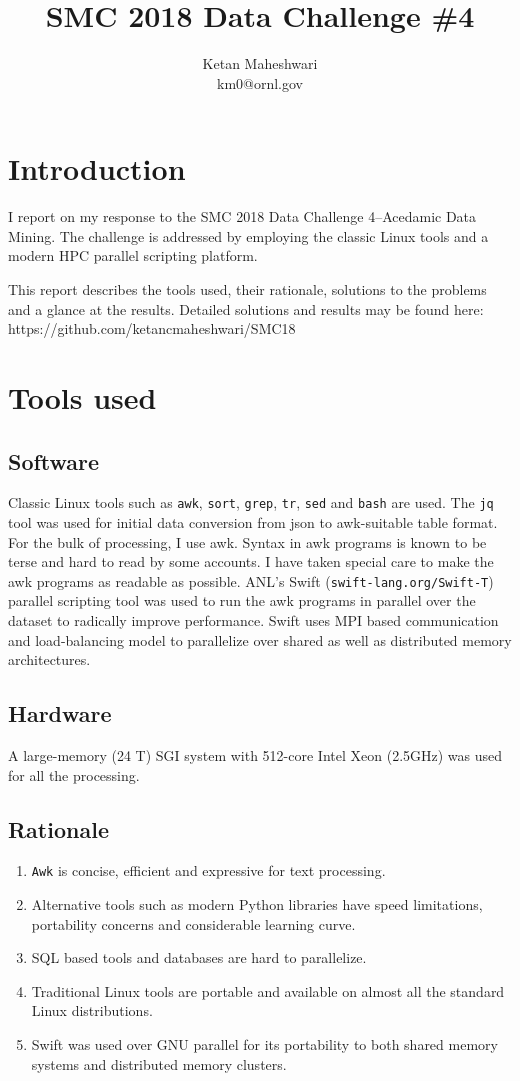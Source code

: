 \documentclass{report}
\title{SMC 2018 Data Challenge \#4}
\author{Ketan Maheshwari\\ km0@ornl.gov}
\begin{document}
\maketitle
\section*{Introduction}

I report on my response to the SMC 2018 Data Challenge 4--Acedamic Data Mining.
The challenge is addressed by employing the classic Linux tools and a modern HPC
parallel scripting platform.

This report describes the tools used, their rationale, solutions to the
problems and a glance at the results. Detailed solutions and results may be
found here: https://github.com/ketancmaheshwari/SMC18

\section*{Tools used}
\subsection*{Software}
Classic Linux tools such as \texttt{awk}, \texttt{sort}, \texttt{grep},
\texttt{tr}, \texttt{sed} and \texttt{bash} are used.  The \texttt{jq} tool was
used for initial data conversion from json to awk-suitable table format. For
the bulk of processing, I use awk. Syntax in awk programs is known to be terse
and hard to read by some accounts. I have taken special care to make the awk
programs as readable as possible.  ANL's Swift (\texttt{swift-lang.org/Swift-T}) parallel scripting tool was used
to run the awk programs in parallel over the dataset to radically improve
performance. Swift uses MPI based communication and load-balancing model to
parallelize over shared as well as distributed memory architectures.

\subsection*{Hardware}
A large-memory (24 T) SGI system with 512-core Intel Xeon (2.5GHz) was used for
all the processing.

\subsection*{Rationale}
\begin{enumerate}
\item \texttt{Awk} is concise, efficient and expressive for text processing.
\item Alternative tools such as modern Python libraries have speed limitations, portability concerns and considerable learning curve.
\item SQL based tools and databases are hard to parallelize.
\item Traditional Linux tools are portable and available on almost all the standard Linux distributions.
\item Swift was used over GNU parallel for its portability to both shared memory systems and distributed memory clusters.
\end{enumerate}
\end{document}
